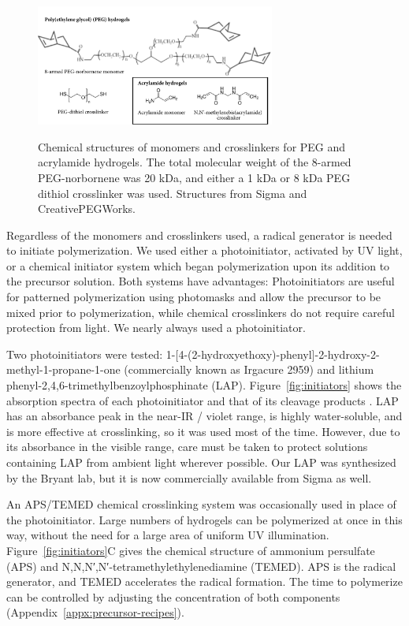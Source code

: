\begin{figure}
\caption[Monomers and crosslinkers for PEG and acrylamide hydrogels.]{Chemical structures of monomers and crosslinkers for PEG and acrylamide hydrogels. The total molecular weight of the 8-armed PEG-norbornene was 20 kDa, and either a 1 kDa or 8 kDa PEG dithiol crosslinker was used.  Structures from Sigma and CreativePEGWorks.}
\centering
\includegraphics[width=0.7\textwidth]{figs/ch03/monomer-and-crosslinker}
\label{fig:monomer-crosslinker}
\end{figure}

Regardless of the monomers and crosslinkers used, a radical generator is needed to initiate polymerization.  We used either a photoinitiator, activated by UV light, or a chemical initiator system which began polymerization upon its addition to the precursor solution.  Both systems have advantages: Photoinitiators are useful for patterned polymerization using photomasks and allow the precursor to be mixed prior to polymerization, while chemical crosslinkers do not require careful protection from light.  We nearly always used a photoinitiator.

Two photoinitiators were tested: 1-[4-(2-hydroxyethoxy)-phenyl]-2-hydroxy-2-methyl-1-propane-1-one (commercially known as Irgacure 2959) and lithium phenyl-2,4,6-trimethylbenzoylphosphinate (LAP). %
Figure~\ref{fig:initiators} shows the absorption spectra of each photoinitiator and that of its cleavage products \cite{fairbanks09}.  LAP has an absorbance peak in the near-IR / violet range, is highly water-soluble, and is more effective at crosslinking, so it was used most of the time.  However, due to its absorbance in the visible range, care must be taken to protect solutions containing LAP from ambient light wherever possible.  Our LAP was synthesized by the Bryant lab, but it is now commercially available from Sigma as well.



An APS/TEMED chemical crosslinking system was occasionally used in place of the photoinitiator.  Large numbers of hydrogels can be polymerized at once in this way, without the need for a large area of uniform UV illumination.  Figure~\ref{fig:initiators}C gives the chemical structure of ammonium persulfate (APS) and N,N,N′,N′-tetramethylethylenediamine (TEMED).  APS is the radical generator, and TEMED accelerates the radical formation.  The time to polymerize can be controlled by adjusting the concentration of both components (Appendix~\ref{appx:precursor-recipes}).

